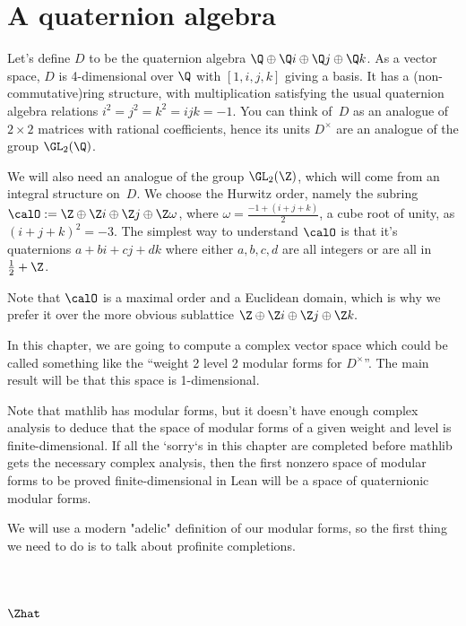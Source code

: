 \section{A quaternion algebra}

Let's define $D$ to be the quaternion algebra $\Q\oplus\Q i\oplus\Q j\oplus\Q k$. As a vector
space, $D$ is 4-dimensional over $\Q$ with $[1,i,j,k]$ giving a basis. It has a (non-commutative)ring structure,
with multiplication satisfying the usual quaternion algebra relations $i^2=j^2=k^2=ijk=-1$.
You can think of~$D$ as an analogue of $2\times 2$
matrices with rational coefficients, hence its units $D^\times$ are an analogue of the
group $\GL_2(\Q)$.

We will also need an analogue of the group $\GL_2(\Z)$, which will come from an integral structure
on~$D$. We choose the Hurwitz order, namely the subring $\calO:=\Z\oplus\Z i\oplus\Z j\oplus\Z \omega$,
where $\omega=\frac{-1+(i+j+k)}{2}$, a cube root of unity, as $(i+j+k)^2=-3$. The simplest way
to understand $\calO$ is that it's quaternions $a+bi+cj+dk$ where either $a,b,c,d$ are all integers
or are all in $\frac{1}{2}+\Z$.

Note that $\calO$ is a maximal order and a Euclidean domain, which is why we prefer it over the
more obvious sublattice $\Z\oplus\Z i\oplus\Z j\oplus\Z k.$

In this chapter, we are going to compute a complex vector space which could be called something
like the ``weight 2 level 2 modular forms for $D^\times$''. The main result will be that this
space is 1-dimensional.

Note that mathlib has modular forms, but it doesn't have enough complex analysis to deduce
that the space of modular forms of a given weight and level is finite-dimensional. If all
the `sorry`s in this chapter are completed
before mathlib gets the necessary complex analysis, then the first nonzero space of modular forms
to be proved finite-dimensional in Lean will be a space of quaternionic modular forms.

We will use a modern "adelic" definition of our modular forms, so the first thing we need
to do is to talk about profinite completions.

\section{\texorpdfstring{$\Zhat$}{Zhat}}

